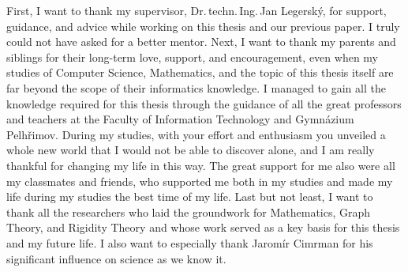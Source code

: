 \documentclass[english,bachelor,unicode,oneside,bw]{ctufit-thesis}
\begin{document}
\frontmatter\frontmatterinit{} %

\thispagestyle{empty}\maketitle\thispagestyle{empty}\cleardoublepage{} %


\imprintpage{} %
\stopTOCentries{} %


\begin{acknowledgmentpage}
	First, I want to thank my supervisor, Dr.\,techn.\,Ing.\,Jan Legerský,
	for support, guidance, and advice while working on this thesis and our previous paper.
	I truly could not have asked for a better mentor.
	Next, I want to thank my parents and siblings for their
	long-term love, support, and encouragement,
	even when my studies of Computer Science, Mathematics,
	and the topic of this thesis itself
	are far beyond the scope of their informatics knowledge.
	I managed to gain all the knowledge required for this thesis
	through the guidance of all the great professors
	and teachers at the Faculty of Information Technology and Gymnázium Pelhřimov.
	During my studies, with your effort and enthusiasm
	you unveiled a whole new world
	that I would not be able to discover alone,
	and I am really thankful for changing my life in this way.
	The great support for me also were all my classmates and friends,
	who supported me both in my studies and made my life during my studies
	the best time of my life.
	Last but not least, I want to thank all the researchers
	who laid the groundwork for Mathematics, Graph Theory, and Rigidity Theory
	and whose work served as a key basis for this thesis and my future life.
	I also want to especially thank Jaromír Cimrman
	for his significant influence on science as we know it.
\end{acknowledgmentpage}
\end{document}
